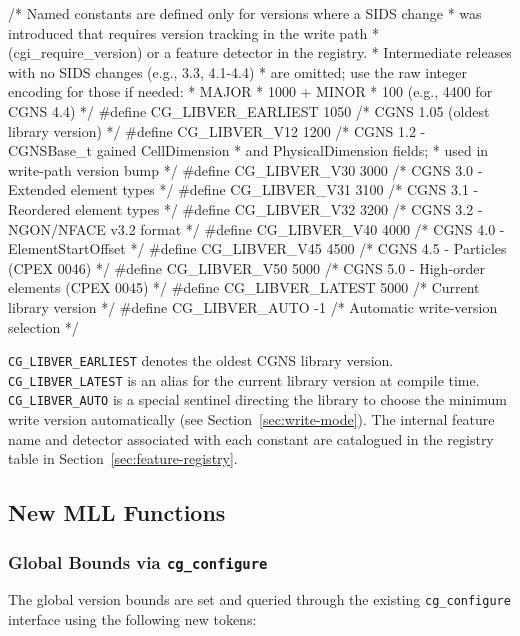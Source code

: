 \documentclass[11pt,letterpaper]{article}
\makeatletter
\let\cgns@orig@lstlisting\lstlisting
\let\cgns@endorig@lstlisting\endlstlisting
\renewenvironment{lstlisting}
  {\par\needspace{5\baselineskip}\nolinenumbers\cgns@orig@lstlisting}
  {\cgns@endorig@lstlisting\par\linenumbers}
\makeatother
\begin{document}
\begin{lstlisting}[language=C]
/* Named constants are defined only for versions where a SIDS change
 * was introduced that requires version tracking in the write path
 * (cgi_require_version) or a feature detector in the registry.
 * Intermediate releases with no SIDS changes (e.g., 3.3, 4.1-4.4)
 * are omitted; use the raw integer encoding for those if needed:
 *   MAJOR * 1000 + MINOR * 100  (e.g., 4400 for CGNS 4.4)
 */
#define CG_LIBVER_EARLIEST  1050  /* CGNS 1.05 (oldest library version) */
#define CG_LIBVER_V12       1200  /* CGNS 1.2  - CGNSBase_t gained CellDimension
                                   *             and PhysicalDimension fields;
                                   *             used in write-path version bump */
#define CG_LIBVER_V30       3000  /* CGNS 3.0  - Extended element types */
#define CG_LIBVER_V31       3100  /* CGNS 3.1  - Reordered element types */
#define CG_LIBVER_V32       3200  /* CGNS 3.2  - NGON/NFACE v3.2 format */
#define CG_LIBVER_V40       4000  /* CGNS 4.0  - ElementStartOffset */
#define CG_LIBVER_V45       4500  /* CGNS 4.5  - Particles (CPEX 0046) */
#define CG_LIBVER_V50       5000  /* CGNS 5.0  - High-order elements (CPEX 0045) */
#define CG_LIBVER_LATEST    5000  /* Current library version */
#define CG_LIBVER_AUTO        -1  /* Automatic write-version selection */
\end{lstlisting}

\texttt{CG\_LIBVER\_EARLIEST} denotes the oldest CGNS library
version.  \texttt{CG\_LIBVER\_LATEST} is an alias for
the current library version at compile time.
\texttt{CG\_LIBVER\_AUTO} is a special sentinel directing the library
to choose the minimum write version automatically (see
Section~\ref{sec:write-mode}).
The internal feature name and detector associated with each constant
are catalogued in the registry table in
Section~\ref{sec:feature-registry}.

\subsection{New MLL Functions}

\subsubsection{Global Bounds via \texttt{cg\_configure}}

The global version bounds are set and queried through the existing
\texttt{cg\_configure} interface using the following new tokens:
\end{document}
